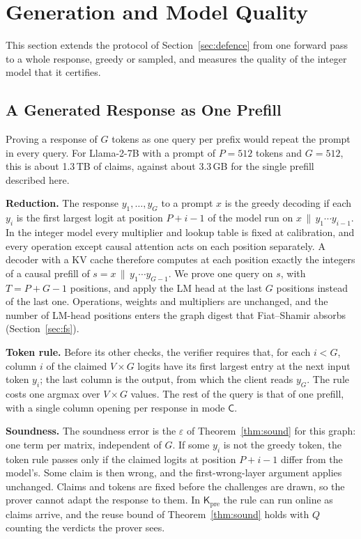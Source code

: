 \providecommand{\Kpre}{\mathsf{K}_{\mathrm{pre}}}
\providecommand{\sC}{\mathsf{C}}
\providecommand{\para}[1]{\par\noindent\textbf{#1}\quad}
\providecommand{\todo}[1]{\textbf{[TODO: #1]}}

\section{Generation and Model Quality}
\label{sec:gen}

This section extends the protocol of Section~\ref{sec:defence} from one forward pass to a whole
response, greedy or sampled, and measures the quality of the integer model that it certifies.

\subsection{A Generated Response as One Prefill}
\label{sec:gen-prefill}

Proving a response of $G$ tokens as one query per prefix would repeat the prompt in every query.
For Llama-2-7B with a prompt of $P=512$ tokens and $G=512$, this is about 1.3\,TB of claims,
against about 3.3\,GB for the single prefill described here.

\para{Reduction.} The response $y_1,\dots,y_G$ to a prompt $x$ is the greedy decoding if each
$y_i$ is the first largest logit at position $P+i-1$ of the model run on
$x\,\|\,y_1\cdots y_{i-1}$. In the integer model every multiplier and lookup table is fixed at
calibration, and every operation except causal attention acts on each position separately. A
decoder with a KV cache therefore computes at each position exactly the integers of a causal
prefill of $s=x\,\|\,y_1\cdots y_{G-1}$. We prove one query on $s$, with $T=P+G-1$ positions, and
apply the LM head at the last $G$ positions instead of the last one. Operations, weights and
multipliers are unchanged, and the number of LM-head positions enters the graph digest that
Fiat--Shamir absorbs (Section~\ref{sec:fs}).

\para{Token rule.} Before its other checks, the verifier requires that, for each $i<G$, column $i$
of the claimed $V\times G$ logits have its first largest entry at the next input token $y_i$; the
last column is the output, from which the client reads $y_G$. The rule costs one argmax over
$V\times G$ values. The rest of the query is that of one prefill, with a single column opening
per response in mode $\sC$.

\para{Soundness.} The soundness error is the $\varepsilon$ of Theorem~\ref{thm:sound} for this
graph: one term per matrix, independent of $G$. If some $y_i$ is not the greedy token, the token
rule passes only if the claimed logits at position $P+i-1$ differ from the model's. Some claim is
then wrong, and the first-wrong-layer argument applies unchanged. Claims and tokens are fixed
before the challenges are drawn, so the prover cannot adapt the response to them. In $\Kpre$ the
rule can run online as claims arrive, and the reuse bound of Theorem~\ref{thm:sound} holds with
$Q$ counting the verdicts the prover sees.

